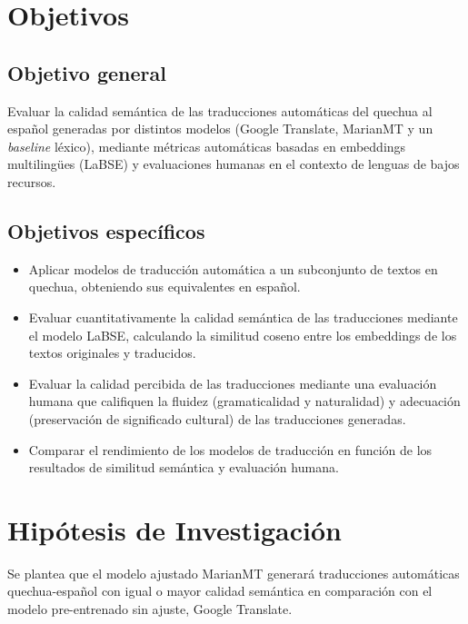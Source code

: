 \section{Objetivos}
\subsection{Objetivo general}
Evaluar la calidad semántica de las traducciones automáticas del quechua al español generadas por distintos modelos (Google Translate, MarianMT y un \textit{baseline} léxico), mediante métricas automáticas basadas en embeddings multilingües (LaBSE) y evaluaciones humanas en el contexto de lenguas de bajos recursos.

\subsection{Objetivos específicos}

\begin{itemize}
	\item Aplicar modelos de traducción automática a un subconjunto de textos en quechua, obteniendo sus equivalentes en español.
	\item Evaluar cuantitativamente la calidad semántica de las traducciones mediante el modelo LaBSE, calculando la similitud coseno entre los embeddings de los textos originales y traducidos.
	\item Evaluar la calidad percibida de las traducciones mediante una evaluación humana que califiquen la fluidez (gramaticalidad y naturalidad) y adecuación (preservación de significado cultural) de las traducciones generadas.
	\item Comparar el rendimiento de los modelos de traducción en función de los resultados de similitud semántica y evaluación humana.

\end{itemize}

\section{Hipótesis de Investigación}

Se plantea que el modelo ajustado MarianMT generará traducciones automáticas quechua-español con igual o mayor calidad semántica en comparación con el modelo pre-entrenado sin ajuste, Google Translate.






